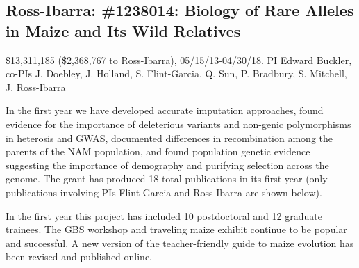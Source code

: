 
\subsection*{Ross-Ibarra: \#1238014: Biology of Rare Alleles in Maize and Its Wild Relatives}
\$13,311,185 (\$2,368,767 to Ross-Ibarra), 05/15/13-04/30/18. PI Edward Buckler, co-PIs J. Doebley, J. Holland, S. Flint-Garcia, Q. Sun, P. Bradbury, S. Mitchell, J. Ross-Ibarra
\par{} In the first year we have developed accurate imputation approaches, found evidence for the importance of deleterious variants and non-genic polymorphisms in heterosis and GWAS, documented differences in recombination among the parents of the NAM population, and found population genetic evidence suggesting the importance of demography and purifying selection across the genome.  The grant has produced 18 total publications in its first year (only publications involving PIs Flint-Garcia and Ross-Ibarra are shown below).
\par{}  In the first year this project has included 10 postdoctoral and 12 graduate trainees. The GBS workshop and traveling maize exhibit continue to be popular and successful. A new version of the teacher-friendly guide to maize evolution has been revised and published online.
\par{} \citet{peiffer2013genetic, Romay2013, wills2013many, Mezmouk2014, Peiffer2014, sood2014mining}

